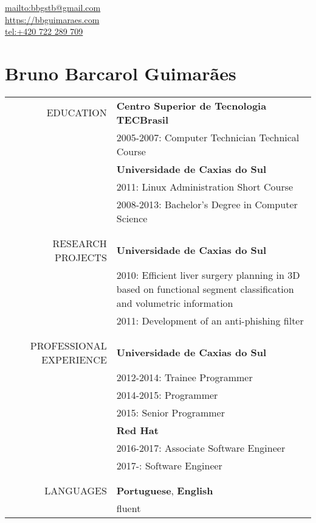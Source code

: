 \begin{flushright}
    \url{mailto:bbgstb@gmail.com} \\
    \url{https://bbguimaraes.com} \\
    \url{tel:+420 722 289 709}
\end{flushright}

\vspace{-2\baselineskip}
\section*{Bruno Barcarol Guimarães}
\bigskip

\begin{tabular}{rp{12cm}}
    \uppercase{Education}
    & \textbf{Centro Superior de Tecnologia TECBrasil} \\
    & 2005-2007: Computer Technician Technical Course \\
    & \textbf{Universidade de Caxias do Sul} \\
    & 2011: Linux Administration Short Course \\
    & 2008-2013: Bachelor's Degree in Computer Science
    \\\\ \hline \\
    \uppercase{Research projects}
    & \textbf{Universidade de Caxias do Sul} \\
    & 2010:
        Efficient liver surgery planning in 3D based on functional segment
        classification and volumetric information \\
    & 2011: Development of an anti-phishing filter
    \\\\ \hline \\
    \uppercase{Professional experience}
    & \textbf{Universidade de Caxias do Sul} \\
    & 2012-2014: Trainee Programmer \\
    & 2014-2015: Programmer \\
    & 2015: Senior Programmer \\
    & \textbf{Red Hat} \\
    & 2016-2017: Associate Software Engineer \\
    & 2017-: Software Engineer
    \\\\ \hline \\
    \uppercase{Languages}
    & \textbf{Portuguese}, \textbf{English} \\
    & fluent \\

\end{tabular}
